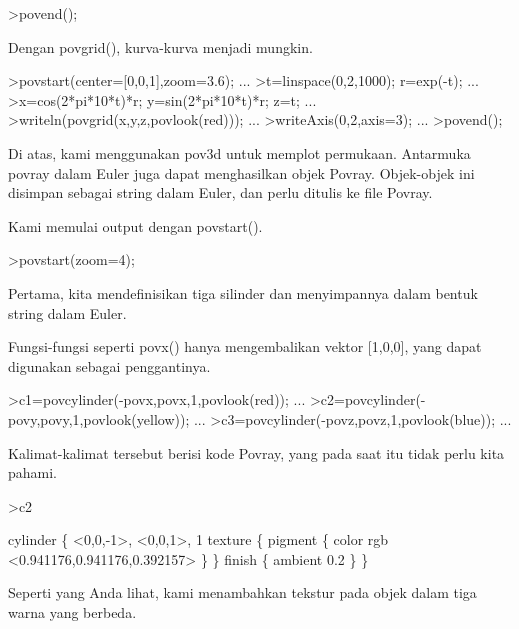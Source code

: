 \documentclass{article}
\begin{document}
\begin{eulernotebook}
\begin{eulerprompt}
>povend();
\end{eulerprompt}
\begin{eulercomment}
Dengan povgrid(), kurva-kurva menjadi mungkin.
\end{eulercomment}
\begin{eulerprompt}
>povstart(center=[0,0,1],zoom=3.6); ...
>t=linspace(0,2,1000); r=exp(-t); ...
>x=cos(2*pi*10*t)*r; y=sin(2*pi*10*t)*r; z=t; ...
>writeln(povgrid(x,y,z,povlook(red))); ...
>writeAxis(0,2,axis=3); ...
>povend();
\end{eulerprompt}
\begin{eulercomment}
Di atas, kami menggunakan pov3d untuk memplot permukaan. Antarmuka
povray dalam Euler juga dapat menghasilkan objek Povray. Objek-objek
ini disimpan sebagai string dalam Euler, dan perlu ditulis ke file
Povray.

Kami memulai output dengan povstart().
\end{eulercomment}
\begin{eulerprompt}
>povstart(zoom=4);
\end{eulerprompt}
\begin{eulercomment}
Pertama, kita mendefinisikan tiga silinder dan menyimpannya dalam
bentuk string dalam Euler.

Fungsi-fungsi seperti povx() hanya mengembalikan vektor [1,0,0], yang
dapat digunakan sebagai penggantinya.
\end{eulercomment}
\begin{eulerprompt}
>c1=povcylinder(-povx,povx,1,povlook(red)); ...
>c2=povcylinder(-povy,povy,1,povlook(yellow)); ...
>c3=povcylinder(-povz,povz,1,povlook(blue)); ...
\end{eulerprompt}
\begin{eulercomment}
Kalimat-kalimat tersebut berisi kode Povray, yang pada saat itu tidak
perlu kita pahami.
\end{eulercomment}
\begin{eulerprompt}
>c2
\end{eulerprompt}
\begin{euleroutput}
  cylinder \{ <0,0,-1>, <0,0,1>, 1
   texture \{ pigment \{ color rgb <0.941176,0.941176,0.392157> \}  \} 
   finish \{ ambient 0.2 \} 
   \}
\end{euleroutput}
\begin{eulercomment}
Seperti yang Anda lihat, kami menambahkan tekstur pada objek dalam
tiga warna yang berbeda.


\end{eulercomment}
\end{eulernotebook}
\end{document}
